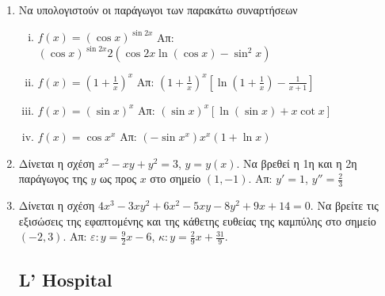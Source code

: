 \begin{enumerate}
  \item  Να υπολογιστούν οι παράγωγοι των παρακάτω συναρτήσεων

    \begin{enumerate}[(i)]
      \item $ f(x) = (\cos{x})^{\sin{2x}} $ \hfill Απ: $
        (\cos{x})^{\sin{2x}} 2(\cos{2x} \ln{(\cos{x})} - \sin^{2}{x}) $
      \item $ f(x) = \left(1 + \frac{1}{x} \right)^{x} $ \hfill Απ: $
        \left(1 + \frac{1}{x}\right)^{x}\left[\ln{(1 + \frac{1}{x})} -
        \frac{1}{x+1}\right] $
      \item $ f(x)=(\sin{x})^{x} $ \hfill Απ: $ (\sin{x})^{x}[\ln{(\sin{x}
        )} + x \cot{x}] $ 
      \item $ f(x)=\cos{x}^{x} $ \hfill Απ: $ (- \sin{x^{x}})x^{x} (1 +
        \ln{x}) $
    \end{enumerate}

    \item Δίνεται η σχέση $ x^{2} - xy + y^{2} = 3 $, $ y=y(x) $. Να βρεθεί η 1η
      και η 2η παράγωγος της $y$ ως προς $x$ στο σημείο $ (1,-1) $.
      \hfill Απ: $ y' = 1$, $ y'' = \frac{2}{3} $

    \item Δίνεται η σχέση $ 4x^{3} - 3xy^{2} + 6x^{2} - 5xy - 8 y^{2} + 9x + 14
      = 0$. Να βρείτε τις εξισώσεις της εφαπτομένης και της κάθετης ευθείας
      της καμπύλης στο σημείο $ (-2,3) $.
      \hfill Απ: $\varepsilon\colon y = \frac{9}{2} x - 6 $, 
      $\kappa\colon y = \frac{2}{9} x + \frac{31}{9} $.


      \subsection*{L' Hospital}


\end{enumerate}

